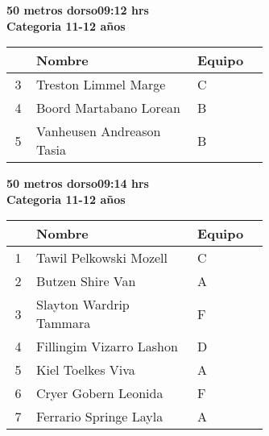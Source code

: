 \begin{minipage}{0.95\linewidth}\vspace{0.5cm} 
\begin{flushleft}
\textbf{
\hspace{-0.15cm}50 metros dorso\hspace{1.5cm}09:12 hrs \\Categoria 11-12 años}\vspace{-0.2cm} 
\end{flushleft}
\begin{tabular}{cp{0.63\linewidth}l}
\hline
& \textbf{Nombre} & \textbf{Equipo} \\ \hline
3 & Treston Limmel Marge & C \\ 
4 & Boord Martabano Lorean & B \\ 
5 & Vanheusen Andreason Tasia & B \\ 
\end{tabular}
\end{minipage}
\begin{minipage}{0.95\linewidth}\vspace{0.5cm} 
\begin{flushleft}
\textbf{
\hspace{-0.15cm}50 metros dorso\hspace{1.5cm}09:14 hrs \\Categoria 11-12 años}\vspace{-0.2cm} 
\end{flushleft}
\begin{tabular}{cp{0.63\linewidth}l}
\hline
& \textbf{Nombre} & \textbf{Equipo} \\ \hline
1 & Tawil Pelkowski Mozell & C \\ 
2 & Butzen Shire Van & A \\ 
3 & Slayton Wardrip Tammara & F \\ 
4 & Fillingim Vizarro Lashon & D \\ 
5 & Kiel Toelkes Viva & A \\ 
6 & Cryer Gobern Leonida & F \\ 
7 & Ferrario Springe Layla & A \\ 
\end{tabular}
\end{minipage}
